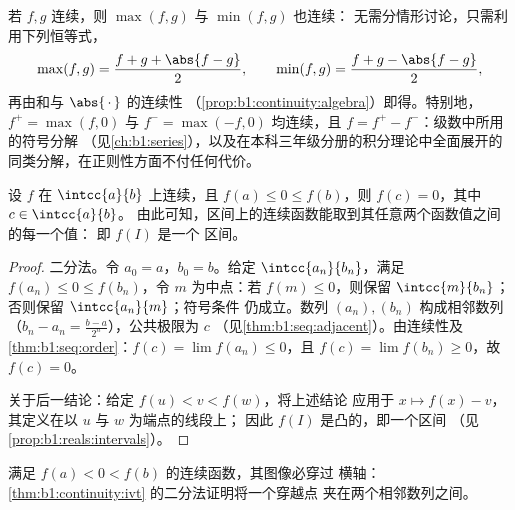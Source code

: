 \begin{example}[连续函数的最大值与最小值]\label{ex:b1:continuity:maxmin}
若 $f, g$ 连续，则 $\max(f, g)$ 与 $\min(f, g)$ 也连续：
无需分情形讨论，只需利用下列恒等式，
\[
\max(f, g) = \frac{f + g + \abs{f - g}}{2},
\qquad
\min(f, g) = \frac{f + g - \abs{f - g}}{2},
\]
再由和与 $\abs{\,\cdot\,}$ 的连续性
（\cref{prop:b1:continuity:algebra}）即得。特别地，$f^+ =
\max(f, 0)$ 与 $f^- = \max(-f, 0)$ 均连续，且 $f =
f^+ - f^-$：级数中所用的符号分解
（见\cref{ch:b1:series}），以及在本科三年级分册的积分理论中全面展开的
同类分解，在正则性方面不付任何代价。
\end{example}

\begin{theorem}[介值定理]\label{thm:b1:continuity:ivt}
设 $f$ 在 $\intcc{a}{b}$ 上连续，且 $f(a) \leq 0 \leq
f(b)$，则 $f(c) = 0$，其中 $c \in \intcc{a}{b}$。
由此可知，区间上的连续函数能取到其任意两个函数值之间的每一个值：
即 $f(I)$ 是一个
区间。
\end{theorem}

\begin{proof}
二分法。令 $a_0 = a$，$b_0 = b$。给定 $\intcc{a_n}{b_n}$，满足
$f(a_n) \leq 0 \leq f(b_n)$，令 $m$ 为中点：若 $f(m) \leq
0$，则保留 $\intcc{m}{b_n}$；否则保留 $\intcc{a_n}{m}$；符号条件
仍成立。数列 $(a_n), (b_n)$ 构成相邻数列（$b_n -
a_n = \frac{b-a}{2^n}$），公共极限为 $c$
（见\cref{thm:b1:seq:adjacent}）。由连续性及
\cref{thm:b1:seq:order}：$f(c) = \lim f(a_n) \leq 0$，且 $f(c) =
\lim f(b_n) \geq 0$，故 $f(c) = 0$。

关于后一结论：给定 $f(u) < v < f(w)$，将上述结论
应用于 $x \mapsto f(x) - v$，其定义在以 $u$ 与 $w$ 为端点的线段上；
因此 $f(I)$ 是凸的，即一个区间
（见\cref{prop:b1:reals:intervals}）。
\end{proof}

\begin{omfigure}

{\small 满足 $f(a) < 0 < f(b)$ 的连续函数，其图像必穿过
横轴：\cref{thm:b1:continuity:ivt} 的二分法证明将一个穿越点
夹在两个相邻数列之间。}
\end{omfigure}

